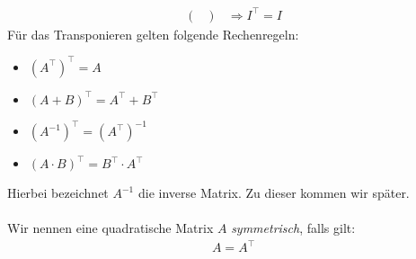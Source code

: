 \begin{enumerate}
\begin{align*}
\begin{pmatrix}
\end{pmatrix}
&\Rightarrow
I^\top = I
\end{align*}
\newpage
Für das Transponieren gelten folgende Rechenregeln:
\begin{itemize}
\item
$(A^\top)^\top =A$
\item
$(A + B)^\top = A^\top + B^\top$
\item
$(A^{-1})^\top = (A^\top)^{-1}$
\item
$(A \cdot B)^\top = B^\top \cdot A^\top$
\end{itemize}
Hierbei bezeichnet $A^{-1}$ die inverse Matrix.
Zu dieser kommen wir später.\\ \\
Wir nennen eine quadratische Matrix $A$ \textit{symmetrisch}, falls gilt:
\begin{align*}
A = A^\top
\end{align*}
\end{enumerate} 
\newpage
